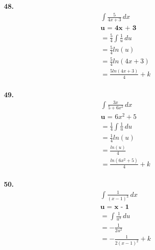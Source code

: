 \documentclass{article}
\begin{document}
\textbf{48.}
\begin{gather*}
    \int \frac{5}{4x+3} \,dx
\\
    \textbf{u = 4x + 3}
\\
    = \frac{5}{4}\int \frac{1}{u}\,du
\\
    = \frac{5}{4} ln(u)
\\
    = \frac{5}{4} ln(4x+3)
\\ 
    = \frac{5 ln(4x+3)}{4} + k
\\
\end{gather*}

\textbf{49.}
\begin{gather*}
    \int \frac{3x}{5+6x^2}\,dx
    \\
    \textbf{u = } 6x^2+5
\\
    = \frac{1}{4}\int \frac{1}{u}\,du
\\
    = \frac{1}{4} ln(u)    
\\ 
    = \frac{ln(u)}{4}
\\
    = \frac{ln(6x^2+5)}{4} + k
\\
\end{gather*}

\textbf{50.}
\begin{gather*}
    \int \frac{1}{(x - 1)^3} \,dx
\\
    \textbf{u = x - 1}
\\
    = \int \frac{1}{u^3}\,du
\\
    = -\frac{1}{2u^2}
\\ 
    = -\frac{1}{2(x-1)^2} + k
\\
\end{gather*}
\end{document}
